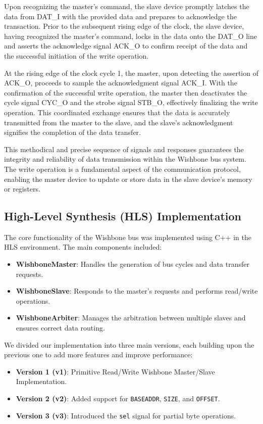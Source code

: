 \documentclass[conference]{IEEEtran}
\begin{document}
Upon recognizing the master's command, the slave device promptly latches the data from DAT\_I with the provided data and prepares to acknowledge the transaction. Prior to the subsequent rising edge of the clock, the slave device, having recognized the master's command, locks in the data onto the DAT\_O line and asserts the acknowledge signal ACK\_O to confirm receipt of the data and the successful initiation of the write operation.

At the rising edge of the clock cycle 1, the master, upon detecting the assertion of ACK\_O, proceeds to sample the acknowledgment signal ACK\_I. With the confirmation of the successful write operation, the master then deactivates the cycle signal CYC\_O and the strobe signal STB\_O, effectively finalizing the write operation. This coordinated exchange ensures that the data is accurately transmitted from the master to the slave, and the slave's acknowledgment signifies the completion of the data transfer.

This methodical and precise sequence of signals and responses guarantees the integrity and reliability of data transmission within the Wishbone bus system. The write operation is a fundamental aspect of the communication protocol, enabling the master device to update or store data in the slave device's memory or registers.


\subsection{High-Level Synthesis (HLS) Implementation}
The core functionality of the Wishbone bus was implemented using C++ in the HLS environment. The main components included:
\begin{itemize}
    \item \textbf{WishboneMaster}: Handles the generation of bus cycles and data transfer requests.
    \item \textbf{WishboneSlave}: Responds to the master's requests and performs read/write operations.
    \item \textbf{WishboneArbiter}: Manages the arbitration between multiple slaves and ensures correct data routing.
\end{itemize}


We divided our implementation into three main versions, each building upon the previous one to add more features and improve performance:

\begin{itemize}
    \item \textbf{Version 1 (v1)}: Primitive Read/Write Wishbone Master/Slave Implementation.
    \item \textbf{Version 2 (v2)}: Added support for \texttt{BASEADDR}, \texttt{SIZE}, and \texttt{OFFSET}.
    \item \textbf{Version 3 (v3)}: Introduced the \texttt{sel} signal for partial byte operations.
\end{itemize}
\end{document}
